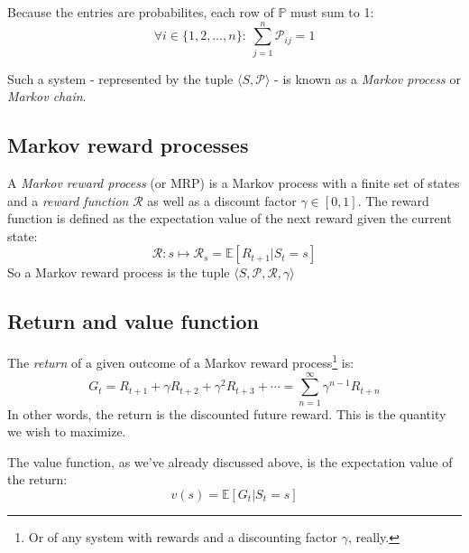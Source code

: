 \documentclass[12pt, a4paper]{article}
\numberwithin{equation}{section}
\begin{document}
Because the entries are probabilites, each row of $\mathbb{P}$ must sum to 1:
\begin{equation}
\forall i\in\{1, 2,\ldots,n\}:\ \sum_{j=1}^n\mathcal{P}_{ij}=1
\end{equation}

Such a system - represented by the tuple $\langle S,\mathcal{P}\rangle$ - is known as a \textit{Markov process} or \textit{Markov chain}.

\subsection{Markov reward processes}
A \textit{Markov reward process} (or MRP) is a Markov process with a finite set of states and a \textit{reward function} $\mathcal{R}$ as well as a discount factor $\gamma\in[0,1]$. The reward function is defined as the expectation value of the next reward given the current state:
\begin{equation}
\mathcal{R}: s\mapsto\mathcal{R}_s=\mathbb{E}[R_{t+1}|S_t=s]
\label{reward}
\end{equation}
So a Markov reward process is the tuple $\langle S,\mathcal{P},\mathcal{R},\gamma\rangle$

\subsection{Return and value function}
The \textit{return} of a given outcome of a Markov reward process\footnote{Or of any system with rewards and a discounting factor $\gamma$, really.} is:
\begin{equation}
G_t=R_{t+1}+\gamma R_{t+2}+\gamma^2 R_{t+3}+\cdots=\sum_{n=1}^\infty \gamma^{n-1} R_{t+n}
\label{return}
\end{equation}
In other words, the return is the discounted future reward. This is the quantity we wish to maximize.

The value function, as we've already discussed above, is the expectation value of the return:
\begin{equation}
v(s)=\mathbb{E}[G_t|S_t=s]
\label{value}
\end{equation}
\end{document}
